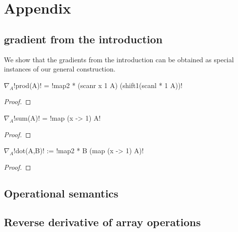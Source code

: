 \section{Appendix}

 \subsection{gradient from the introduction}

 We show that the gradients from the introduction 
 can be obtained as special instances of our general construction. 

 \begin{lemma}
     $\nabla_A$!prod(A)! = !map2 * (scanr x 1 A) (shift1(scanl * 1 A))!
 \end{lemma}

 \begin{proof}

 \end{proof}

 \begin{lemma}
     $\nabla_A$!sum(A)! = !map (x -> 1) A!
 \end{lemma}

 \begin{proof}

 \end{proof}

 \begin{lemma}
     $\nabla_A$!dot(A,B)! := !map2 * B (map (x -> 1) A)! 
 \end{lemma}

 \begin{proof}

 \end{proof}

 \subsection{Operational semantics}

 \subsection{Reverse derivative of array operations}

 

